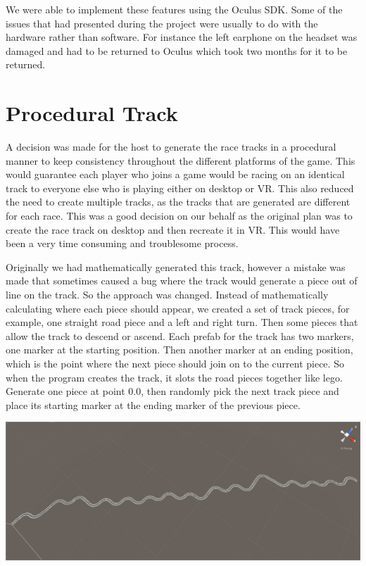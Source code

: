 We were able to implement these features using the Oculus SDK. Some of the issues that had presented during the project were usually to do with the hardware rather than software. For instance the left earphone on the headset was damaged and had to be returned to Oculus which took two months for it to be returned.\newline

\section{Procedural Track}
A decision was made for the host to generate the race tracks in a procedural manner to keep consistency throughout the different platforms of the game. This would guarantee each player who joins a game would be racing on an identical track to everyone else who is playing either on desktop or VR. This also reduced the need to create multiple tracks, as the tracks that are generated are different for each race. This was a good decision on our behalf as the original plan was to create the race track on desktop and then recreate it in VR. This would have been a very time consuming and troublesome process.\newline

Originally we had mathematically generated this track, however a mistake was made that sometimes caused a bug where the track would generate a piece out of line on the track. So the approach was changed. Instead of mathematically calculating where each piece should appear, we created a set of track pieces, for example, one straight road piece and a left and right turn. Then some pieces that allow the track to descend or ascend. Each prefab for the track has two markers, one marker at the starting position. Then another marker at an ending position, which is the point where the next piece should join on to the current piece. So when the program creates the track, it slots the road pieces together like lego. Generate one piece at point 0.0, then randomly pick the next track piece and place its starting marker at the ending marker of the previous piece.\newline

\includegraphics[width=1\columnwidth]{img/ProceduralTrack1.PNG}


